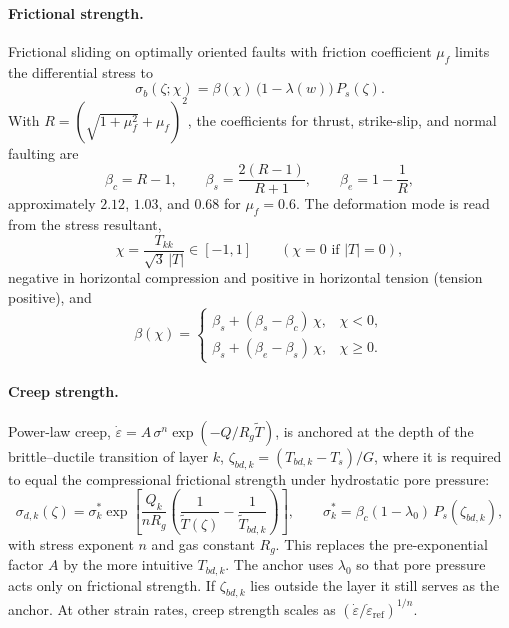 \documentclass[11pt]{article}
\newcommand{\inv}[1]{\left| #1 \right|}
\newcommand{\Tk}{\tilde{T}}
\begin{document}
\paragraph{Frictional strength.}
Frictional sliding on optimally oriented faults with friction coefficient
$\mu_f$ \cite{Byerlee1978} limits the differential stress to
\begin{equation}
  \sigma_b(\zeta;\chi) = \beta(\chi)\,\big(1-\lambda(w)\big)\,P_s(\zeta).
  \label{eq:brittle}
\end{equation}
With $R = (\sqrt{1+\mu_f^2}+\mu_f)^2$, the coefficients for thrust, strike-slip,
and normal faulting are
\begin{equation}
  \beta_c = R - 1, \qquad
  \beta_s = \frac{2(R-1)}{R+1}, \qquad
  \beta_e = 1 - \frac{1}{R},
\end{equation}
approximately $2.12$, $1.03$, and $0.68$ for $\mu_f = 0.6$. The deformation mode
is read from the stress resultant,
\begin{equation}
  \chi = \frac{T_{kk}}{\sqrt3\,\inv{T}} \in [-1,1]
  \qquad (\chi = 0 \text{ if } \inv{T}=0),
  \label{eq:chi}
\end{equation}
negative in horizontal compression and positive in horizontal tension (tension
positive), and
\begin{equation}
  \beta(\chi) =
  \begin{cases}
    \beta_s + (\beta_s - \beta_c)\,\chi, & \chi < 0,\\
    \beta_s + (\beta_e - \beta_s)\,\chi, & \chi \ge 0.
  \end{cases}
\end{equation}

\paragraph{Creep strength.}
Power-law creep, $\dot\varepsilon = A\,\sigma^n\exp(-Q/R_g\Tk)$, is anchored at
the depth of the brittle--ductile transition of layer $k$,
$\zeta_{bd,k} = (T_{bd,k} - T_s)/G$, where it is required to equal the
compressional frictional strength under hydrostatic pore pressure:
\begin{equation}
  \sigma_{d,k}(\zeta) = \sigma^*_k
  \exp\!\left[\frac{Q_k}{n R_g}\left(\frac{1}{\Tk(\zeta)} - \frac{1}{\Tk_{bd,k}}\right)\right],
  \qquad
  \sigma^*_k = \beta_c(1-\lambda_0)\,P_s(\zeta_{bd,k}),
  \label{eq:ductile}
\end{equation}
with stress exponent $n$ and gas constant $R_g$. This replaces the
pre-exponential factor $A$ by the more intuitive $T_{bd,k}$. The anchor uses
$\lambda_0$ so that pore pressure acts only on frictional strength. If
$\zeta_{bd,k}$ lies outside the layer it still serves as the anchor. At other
strain rates, creep strength scales as
$(\dot\varepsilon/\dot\varepsilon_{\mathrm{ref}})^{1/n}$.
\end{document}
